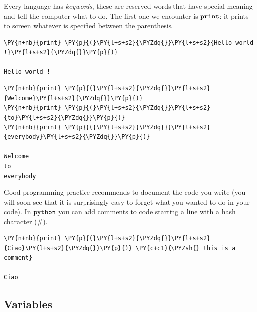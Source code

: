 Every language has \emph{keywords}, these are reserved words that have special meaning and tell the computer what to do. The first one we encounter is \(\tt{print}\): it prints to screen whatever is specified between the parenthesis.

\begin{tcolorbox}[breakable, size=fbox, boxrule=1pt, pad at break*=1mm, colback=cellbackground, colframe=cellborder]
\begin{Verbatim}[commandchars=\\\{\}]
\PY{n+nb}{print} \PY{p}{(}\PY{l+s+s2}{\PYZdq{}}\PY{l+s+s2}{Hello world !}\PY{l+s+s2}{\PYZdq{}}\PY{p}{)} 

Hello world !
\end{Verbatim}
\end{tcolorbox}

\begin{tcolorbox}[breakable, size=fbox, boxrule=1pt, pad at break*=1mm, colback=cellbackground, colframe=cellborder]
\begin{Verbatim}[commandchars=\\\{\}]
\PY{n+nb}{print} \PY{p}{(}\PY{l+s+s2}{\PYZdq{}}\PY{l+s+s2}{Welcome}\PY{l+s+s2}{\PYZdq{}}\PY{p}{)}
\PY{n+nb}{print} \PY{p}{(}\PY{l+s+s2}{\PYZdq{}}\PY{l+s+s2}{to}\PY{l+s+s2}{\PYZdq{}}\PY{p}{)}
\PY{n+nb}{print} \PY{p}{(}\PY{l+s+s2}{\PYZdq{}}\PY{l+s+s2}{everybody}\PY{l+s+s2}{\PYZdq{}}\PY{p}{)}

Welcome
to
everybody
\end{Verbatim}
\end{tcolorbox}

Good programming practice recommends to document the code you write (you will soon see that it is surprisingly easy to forget what you wanted to do in your code). In \(\tt{python}\) you can add comments to code starting a line with a hash character (\#).

\begin{tcolorbox}[breakable, size=fbox, boxrule=1pt, pad at break*=1mm, colback=cellbackground, colframe=cellborder]
\begin{Verbatim}[commandchars=\\\{\}]
\PY{n+nb}{print} \PY{p}{(}\PY{l+s+s2}{\PYZdq{}}\PY{l+s+s2}{Ciao}\PY{l+s+s2}{\PYZdq{}}\PY{p}{)} \PY{c+c1}{\PYZsh{} this is a comment}

Ciao
\end{Verbatim}
\end{tcolorbox}

\subsection{Variables}\label{variables}

